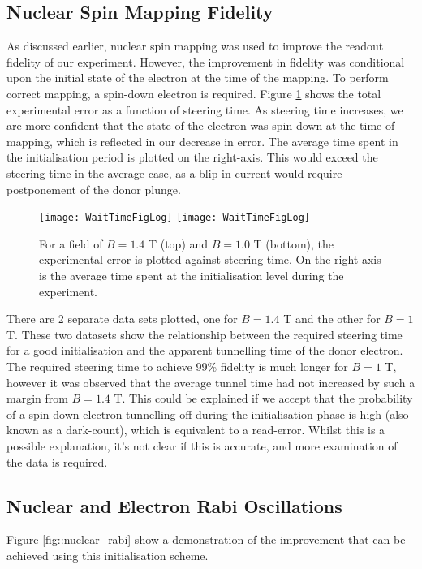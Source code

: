 \label{sec::results}
\subsection{Nuclear Spin Mapping Fidelity}

	As discussed earlier, nuclear spin mapping was used to improve the readout fidelity of our experiment. However, the improvement in fidelity was conditional upon the initial state of the electron at the time of the mapping. To perform correct mapping, a spin-down electron is required. Figure \ref{fig::wait_time} shows the total experimental error as a function of steering time. As steering time increases, we are more confident that the state of the electron was spin-down at the time of mapping, which is reflected in our decrease in error. The average time spent in the initialisation period is plotted on the right-axis. This would exceed the steering time in the average case, as a blip in current would require postponement of the donor plunge.
	\begin{figure}[htbp!]
		\centering
		\texttt{[image: WaitTimeFigLog]}
		\texttt{[image: WaitTimeFigLog]}
		\caption{For a field of $B = 1.4$ T (top) and $B = 1.0$ T (bottom), the experimental error is plotted against steering time. On  the right axis is the average time spent at the initialisation level during the experiment.}
		\label{fig::wait_time}
	\end{figure}
	
	There are 2 separate data sets plotted, one for $B = 1.4$ T and the other for $B = 1$ T. These two datasets show the relationship between the required steering time for a good initialisation and the apparent tunnelling time of the donor electron. The required steering time to achieve 99\% fidelity is much longer for $B = 1$ T, however it was observed that the average tunnel time had not increased by such a margin from $B = 1.4$ T. This could be explained if we accept that the probability of a spin-down electron tunnelling off during the initialisation phase is high (also known as a dark-count), which is equivalent to a read-error. Whilst this is a possible explanation, it's not clear if this is accurate, and more examination of the data is required.

\subsection{Nuclear and Electron Rabi Oscillations}
	Figure \ref{fig::nuclear_rabi} show a demonstration of the improvement that can be achieved using this initialisation scheme.
	
